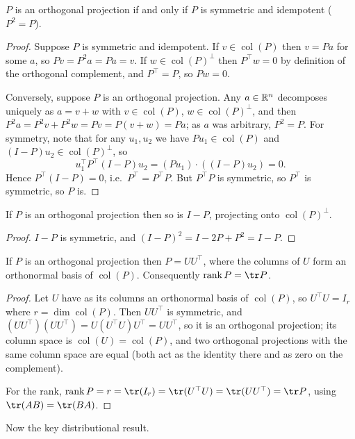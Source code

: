 \documentclass[a4paper]{scrartcl}
\newcommand{\rank}{\operatorname{rank}}
\newcommand{\col}{\operatorname{col}}
\begin{document}
\begin{proposition}
  $P$ is an orthogonal projection if and only if $P$ is symmetric and idempotent ($P^2 = P$).
\end{proposition}
\begin{proof}
  Suppose $P$ is symmetric and idempotent. If $v \in \col(P)$ then $v = Pa$ for some $a$, so $Pv = P^2a = Pa = v$. If $w \in \col(P)^\perp$ then $P^\top w = 0$ by definition of the orthogonal complement, and $P^\top = P$, so $Pw = 0$.

  Conversely, suppose $P$ is an orthogonal projection. Any $a \in \mathbb{R}^n$ decomposes uniquely as $a = v + w$ with $v \in \col(P)$, $w \in \col(P)^\perp$, and then $P^2a = P^2 v + P^2 w = Pv = P(v+w) = Pa$; as $a$ was arbitrary, $P^2 = P$. For symmetry, note that for any $u_1, u_2$ we have $Pu_1 \in \col(P)$ and $(I-P)u_2 \in \col(P)^\perp$, so
  $$
  u_1^\top P^\top (I-P)u_2 = \left(Pu_1\right)\cdot\left((I-P)u_2\right) = 0.
  $$
  Hence $P^\top(I-P) = 0$, i.e.\ $P^\top = P^\top P$. But $P^\top P$ is symmetric, so $P^\top$ is symmetric, so $P$ is.
\end{proof}

\begin{corollary}
  If $P$ is an orthogonal projection then so is $I - P$, projecting onto $\col(P)^\perp$.
\end{corollary}
\begin{proof}
  $I-P$ is symmetric, and $(I-P)^2 = I - 2P + P^2 = I - P$.
\end{proof}

\begin{proposition}
  If $P$ is an orthogonal projection then $P = UU^\top$, where the columns of $U$ form an orthonormal basis of $\col(P)$. Consequently $\rank P = \tr P$.
\end{proposition}
\begin{proof}
  Let $U$ have as its columns an orthonormal basis of $\col(P)$, so $U^\top U = I_r$ where $r = \dim\col(P)$. Then $UU^\top$ is symmetric, and $(UU^\top)(UU^\top) = U(U^\top U)U^\top = UU^\top$, so it is an orthogonal projection; its column space is $\col(U) = \col(P)$, and two orthogonal projections with the same column space are equal (both act as the identity there and as zero on the complement).

  For the rank, $\rank P = r = \tr(I_r) = \tr(U^\top U) = \tr(UU^\top) = \tr P$, using $\tr(AB) = \tr(BA)$.
\end{proof}

Now the key distributional result.
\end{document}
